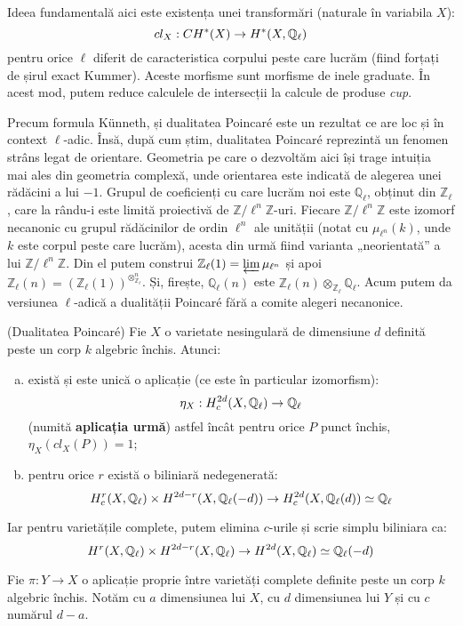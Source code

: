 \documentclass[13pt,openany]{book}
\begin{document}
Ideea fundamentală aici este existența unei transformări (naturale în variabila $X$):
$$cl_X : CH^*(X) \rightarrow H^*(X,\mathbb{Q}_\ell)$$
pentru orice $\ell$ diferit de caracteristica corpului peste care lucrăm (fiind forțați de șirul exact Kummer). Aceste morfisme sunt morfisme de inele graduate. În acest mod, putem reduce calculele de intersecții la calcule de produse {\it cup}.

Precum formula Künneth, și dualitatea Poincaré este un rezultat ce are loc și în context $\ell$-adic. Însă, după cum știm, dualitatea Poincaré reprezintă un fenomen strâns legat de orientare. Geometria pe care o dezvoltăm aici își trage intuiția mai ales din geometria complexă, unde orientarea este indicată de alegerea unei rădăcini a lui $-1$. Grupul de coeficienți cu care lucrăm noi este $\mathbb{Q}_\ell$, obținut din $\mathbb{Z}_\ell$, care la rându-i este limită proiectivă de $\mathbb{Z}/\ell^n\mathbb{Z}$-uri. Fiecare $\mathbb{Z}/\ell^n\mathbb{Z}$ este izomorf necanonic cu grupul rădăcinilor de ordin $\ell^n$ ale unității (notat cu $\mu_{\ell^n}(k)$, unde $k$ este corpul peste care lucrăm), acesta din urmă fiind varianta „neorientată” a lui $\mathbb{Z}/\ell^n\mathbb{Z}$. Din el putem construi $\mathbb{Z}_\ell(1)=\varprojlim \mu_{\ell^n}$ și apoi $\mathbb{Z}_\ell(n)=(\mathbb{Z}_\ell(1))^{\otimes_{\mathbb{Z}_\ell}^n}$. Și, firește, $\mathbb{Q}_\ell(n)$ este $\mathbb{Z}_\ell(n) \otimes_{\mathbb{Z}_\ell} \mathbb{Q}_\ell$. Acum putem da versiunea $\ell$-adică a dualității Poincaré fără a comite alegeri necanonice.

\begin{teo}
(Dualitatea Poincaré) Fie $X$ o varietate nesingulară de dimensiune $d$ definită peste un corp $k$ algebric închis. Atunci:
\begin{enumerate}[a)]
\item există și este unică o aplicație (ce este în particular izomorfism):
$$\eta_X : H^{2d}_c(X,\mathbb{Q}_\ell) \rightarrow \mathbb{Q}_\ell$$
(numită {\bf aplicația urmă}) astfel încât pentru orice $P$ punct închis, $\eta_X(cl_X(P))=1$;
\item pentru orice $r$ există o biliniară nedegenerată:
$$H^r_c(X,\mathbb{Q}_\ell) \times H^{2d-r}(X,\mathbb{Q}_\ell(-d)) \rightarrow H^{2d}_c(X,\mathbb{Q}_\ell(d)) \simeq \mathbb{Q}_\ell$$
\end{enumerate}
Iar pentru varietățile complete, putem elimina $c$-urile și scrie simplu biliniara ca:
$$H^r(X,\mathbb{Q}_\ell) \times H^{2d-r}(X,\mathbb{Q}_\ell) \rightarrow H^{2d}(X,\mathbb{Q}_\ell) \simeq \mathbb{Q}_\ell(-d)$$
\end{teo}

Fie $\pi : Y \rightarrow X$ o aplicație proprie între varietăți complete definite peste un corp $k$ algebric închis. Notăm cu $a$ dimensiunea lui $X$, cu $d$ dimensiunea lui $Y$ și cu $c$ numărul $d-a$.
\end{document}
